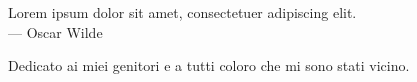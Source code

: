 \cleardoublepage
{}
\thispagestyle{empty}

\vspace*{3cm}

\begin{center}
    Lorem ipsum dolor sit amet, consectetuer adipiscing elit. \\ \medskip
    --- Oscar Wilde
\end{center}

\medskip

\begin{center}
    Dedicato ai miei genitori e a tutti coloro che mi sono stati vicino.
\end{center}

